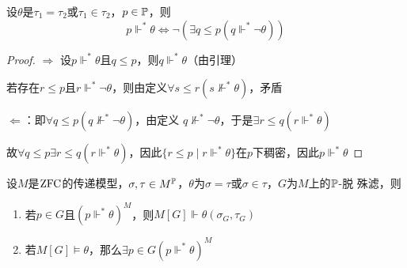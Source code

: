 \documentclass[11pt]{article}
\begin{document}
\begin{lemma}[]
设\(\theta\)是\(\tau_1=\tau_2\)或\(\tau_1\in\tau_2\)，\(p\in\P\)，则
\begin{equation*}
p\Vdash^*\theta\Leftrightarrow\neg(\exists q\le p(q\Vdash^*\neg\theta))
\end{equation*}
\end{lemma}

\begin{proof}
\(\Rightarrow\) 设\(p\Vdash^*\theta\)且\(q\le p\)，则\(q\Vdash^*\theta\)（由引理）

若存在\(r\le p\)且\(r\Vdash^*\neg\theta\)，则由定义\(\forall s\le r(s\not\Vdash^*\theta)\)，矛盾

\(\Leftarrow\)：即\(\forall q\le p(q\not\Vdash^*\neg\theta)\)，由定义
\(q\not\Vdash^*\neg\theta\)，于是\(\exists r\le q(r\Vdash^*\theta)\)

故\(\forall q\le p\exists r\le q(r\Vdash^*\theta)\)，因此\(\{r\le p\mid r\Vdash^*\theta\}\)在\(p\)下稠密，因此\(p\Vdash^*\theta\)
\end{proof}

\begin{lemma}[原子公式的真相引理]
设\(M\)是\(\ZFC\)的传递模型，\(\sigma,\tau\in M^{\P}\)，\(\theta\)为\(\sigma=\tau\)或\(\sigma\in\tau\)，\(G\)为\(M\)上的\(\P\)-脱
殊滤，则
\begin{enumerate}
\item 若\(p\in G\)且\((p\Vdash^*\theta)^M\)，则\(M[G]\Vdash\theta(\sigma_G,\tau_G)\)
\item 若\(M[G]\vDash\theta\)，那么\(\exists p\in G(p\Vdash^*\theta)^M\)
\end{enumerate}
\end{lemma}
\end{document}

